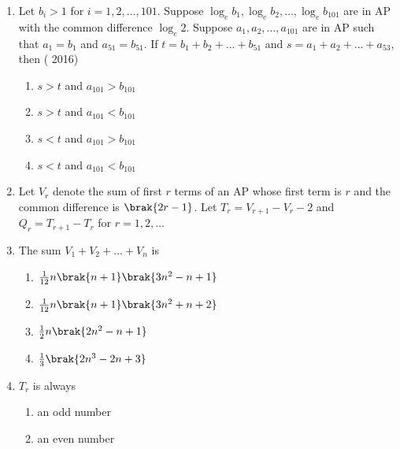 \begin{enumerate}[label=\thesubsection.\arabic*,ref=\thesubsection.\theenumi]
\begin{multicols}{4}
                    \end{multicols}
\item Let ${b_i}>1$ for $i=1, 2, \dots, 101$. Suppose ${\log_e}{b_1}, {\log_e}{b_2}, \dots, {\log_e}{b_{101}}$ are in  AP   with the common difference ${\log_e}2$. Suppose ${a_1, a_2, \dots, a_{101}}$ are in AP such that ${a_1=b_1}$ and ${a_{51}=b_{51}}$. If $t={b_1+b_2+\dots+b_{51}}$ and $s={a_1+a_2+\dots+a_{53}}$,  then \hfill ( 2016)
                    \begin{multicols}{2}
\begin{enumerate}    
%                    
                        \item $s>t$ and ${a_{101}>b_{101}}$
                        \item $s>t$ and ${a_{101}<b_{101}}$
                        \item $s<t$ and ${a_{101}>b_{101}}$
                        \item $s<t$ and ${a_{101}<b_{101}}$
                        \end{enumerate}
                        \end{multicols}
%    
\item[]
 Let $ V_{r} $ denote the sum of first $r$ terms of an  AP   whose first term is $r$ and the common difference is $\brak{2r-1}$. Let $ T_{r}=V_{r+1}-V_{r}-2 $ and $ Q_{r}=T_{r+1}-T_{r}$ for $r=1, 2, \dots$
% 
%
 \item The sum  $  V_{1}+V_{2}+\dots+V_{n} $  is 
% 
	 \hfill {}                            
     \begin{multicols}{2}
\begin{enumerate}    
%         
	     \item $\frac{1}{12}n\brak{n+1}\brak{3n^{2}-n+1}$
	     \item $\frac{1}{12}n\brak{n+1}\brak{3n^{2}+n+2}$
	     \item $\frac{1}{2}n\brak{2n^{2}-n+1}$
	     \item $\frac{1}{3}\brak{2n^{3}-2n+3}$
    \end{enumerate}
\end{multicols} 
%
  \item $T_{r}$ is always 
%                           
	  \hfill {}                    
                  \begin{multicols}{2}      
\begin{enumerate}     
%	
       \item an odd number 
       \item an even number

\end{enumerate}
\end{multicols}
\end{enumerate}
